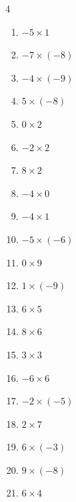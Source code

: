 \begin{multicols}{4}
\begin{enumerate}
  \item $-5\times 1$
        \phantom{$=-5$}

\columnbreak %

  \item $-7\times (-8)$
        \phantom{$=56$}

  \item $-4\times (-9)$
        \phantom{$=36$}

  \item $5\times (-8)$
        \phantom{$=-40$}

  \item $0\times 2$
        \phantom{$=0$}

  \item $-2\times 2$
        \phantom{$=-4$}

  \item $8\times 2$
        \phantom{$=16$}

  \item $-4\times 0$
        \phantom{$=0$}

  \item $-4\times 1$
        \phantom{$=-4$}

  \item $-5\times (-6)$
        \phantom{$=30$}

  \item $0\times 9$
        \phantom{$=0$}

  \item $1\times (-9)$
        \phantom{$=-9$}

  \item $6\times 5$
        \phantom{$=30$}

  \item $8\times 6$
        \phantom{$=48$}

  \item $3\times 3$
        \phantom{$=9$}

  \item $-6\times 6$
        \phantom{$=-36$}

  \item $-2\times (-5)$
        \phantom{$=10$}

  \item $2\times 7$
        \phantom{$=14$}

  \item $6\times (-3)$
        \phantom{$=-18$}

  \item $9\times (-8)$
        \phantom{$=-72$}

  \item $6\times 4$
        \phantom{$=24$}


\end{enumerate}
\end{multicols}
